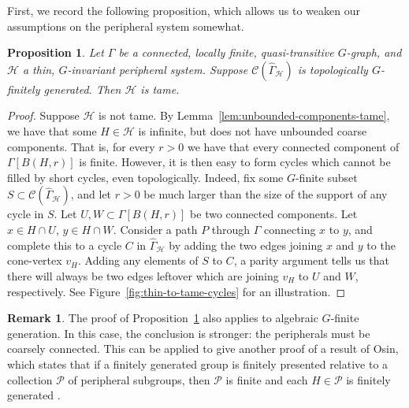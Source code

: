 \documentclass[11pt,a4paper]{amsart}
\newtheorem{proposition}[theorem]{Proposition}
\theoremstyle{definition}
\newtheorem{remark}[theorem]{Remark}
\newcommand{\per}{\mathcal{H}}
\newcommand{\cyc}{\mathscr{C}}
\begin{document}
First, we record the following proposition, which allows us to weaken our assumptions on the peripheral system somewhat. 

\begin{proposition}\label{prop:thin-to-tame-cycles}
    Let $\Gamma$ be a connected, locally finite, quasi-transitive $G$-graph, and $\per$ a thin, $G$-invariant peripheral system. 
    Suppose $\cyc(\widehat \Gamma_\per)$ is topologically $G$-finitely generated. Then $\per$ is tame. 
\end{proposition}

\begin{proof}

    Suppose $\per$ is not tame. By Lemma~\ref{lem:unbounded-components-tame}, we have that some $H \in \per$ is infinite, but does not have unbounded coarse components. That is, for every $r > 0$ we have that every connected component of $\Gamma[B(H,r)]$ is  finite. However, it is then easy to form cycles which cannot be filled by short cycles, even topologically. Indeed, fix some $G$-finite subset $S \subset \cyc(\widehat \Gamma_\per)$, and let $r > 0$ be much larger than the size of the support of any cycle in $S$. Let $U, W \subset \Gamma[B(H,r)]$ be two connected components. Let $x \in H \cap U$, $y \in H \cap W$. Consider a path $P$ through $\Gamma$ connecting $x$ to $y$, and complete this to a cycle  $C$ in $\widehat \Gamma_\per$ by adding the two edges joining $x$ and $y$ to the cone-vertex $v_H$. Adding any elements of $S$ to $C$, a parity argument tells us that there will always be two edges leftover which are joining $v_H$ to $U$ and $W$, respectively. See Figure~\ref{fig:thin-to-tame-cycles} for an illustration.
\end{proof}

\begin{remark}
    The proof of Proposition~\ref{prop:thin-to-tame-cycles} also applies to algebraic $G$-finite generation. In this case, the conclusion is stronger: the peripherals must be coarsely connected. This can be applied to give another proof of a result of Osin, which states that if a finitely generated group is finitely presented relative to a collection $\mathcal P$ of peripheral subgroups, then $\mathcal P$ is finite and each $H \in \mathcal P$ is finitely generated \cite[Thm.~1.1]{osin2004relhyp}. 
\end{remark}
\end{document}
